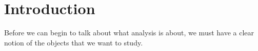 
\section{Introduction}
Before we can begin to talk about what analysis is about, we must have a clear
notion of the objects that we want to study.
